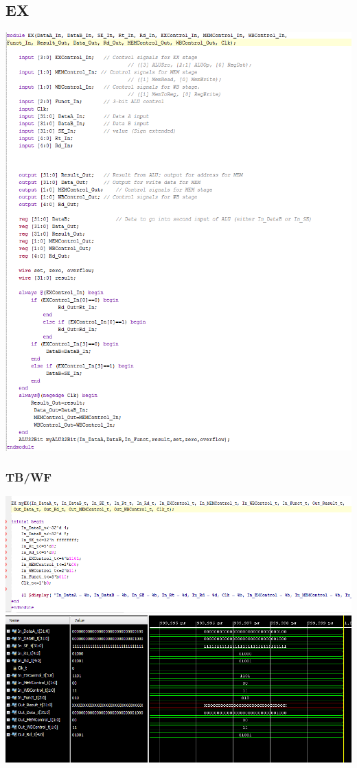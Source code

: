 \documentclass{llncs}
\begin{document}
\begin{addmargin}[-5em]{-2em}
\subsection{EX}
\label{ex:1}
\begin{flushleft}
  \includegraphics[scale=.6]{../Screenshots/EX.PNG}
\end{flushleft}
\subsubsection{TB/WF}
\begin{flushleft}
\includegraphics[scale=.6]{../Screenshots/EX_tb.PNG}
\includegraphics[scale=.6]{../Screenshots/EX_Waveform.PNG}
\end{flushleft}


\end{addmargin}
\end{document}

